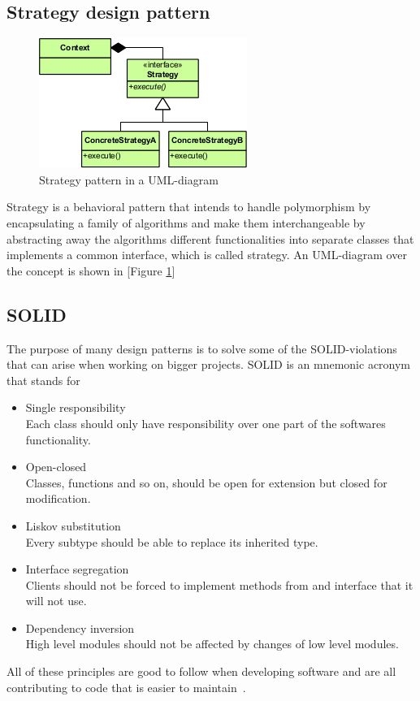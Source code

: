 \documentclass[conference, a4paper]{IEEEtran}
\begin{document}
\subsection{Strategy design pattern}
\label{sec:Strategy}
\begin{figure}[ht!]
	\centering
	\includegraphics[scale=0.7]{Strategy_Pattern_in_UML.png}
	\caption{Strategy pattern in a UML-diagram}
	\label{fig:Strategy}
\end{figure}
Strategy is a behavioral pattern that intends to handle polymorphism by encapsulating a family of algorithms and make them interchangeable by abstracting away the algorithms different functionalities into separate classes that implements a common interface, which is called strategy. An UML-diagram over the concept is shown in [Figure \ref{fig:Strategy}]

\subsection{SOLID}
The purpose of many design patterns is to solve some of the SOLID-violations that can arise when working on bigger projects. SOLID is an mnemonic acronym that stands for
\begin{itemize}
    \item Single responsibility \\
    Each class should only have responsibility over one part of the softwares functionality.
    \item Open-closed \\
    Classes, functions and so on, should be open for extension but closed for modification.
    \item Liskov substitution \\
    Every subtype should be able to replace its inherited type.
    \item Interface segregation \\
    Clients should not be forced to implement methods from and interface that it will not use.
    \item Dependency inversion \\
    High level modules should not be affected by changes of low level modules.
\end{itemize}
All of these principles are good to follow when developing software and are all contributing to code that is easier to maintain~\cite{bibitem:Bob}.
\end{document}
